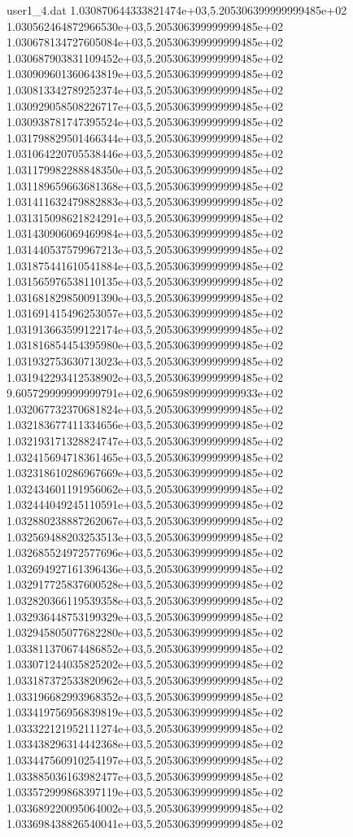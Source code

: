 \begin{filecontents}{user1_4.dat}
1.030870644333821474e+03,5.205306399999999485e+02
1.030562464872966530e+03,5.205306399999999485e+02
1.030678134727605084e+03,5.205306399999999485e+02
1.030687903831109452e+03,5.205306399999999485e+02
1.030909601360643819e+03,5.205306399999999485e+02
1.030813342789252374e+03,5.205306399999999485e+02
1.030929058508226717e+03,5.205306399999999485e+02
1.030938781747395524e+03,5.205306399999999485e+02
1.031798829501466344e+03,5.205306399999999485e+02
1.031064220705538446e+03,5.205306399999999485e+02
1.031179982288848350e+03,5.205306399999999485e+02
1.031189659663681368e+03,5.205306399999999485e+02
1.031411632479882883e+03,5.205306399999999485e+02
1.031315098621824291e+03,5.205306399999999485e+02
1.031430906069469984e+03,5.205306399999999485e+02
1.031440537579967213e+03,5.205306399999999485e+02
1.031875441610541884e+03,5.205306399999999485e+02
1.031565976538110135e+03,5.205306399999999485e+02
1.031681829850091390e+03,5.205306399999999485e+02
1.031691415496253057e+03,5.205306399999999485e+02
1.031913663599122174e+03,5.205306399999999485e+02
1.031816854454395980e+03,5.205306399999999485e+02
1.031932753630713023e+03,5.205306399999999485e+02
1.031942293412538902e+03,5.205306399999999485e+02
9.605729999999999791e+02,6.906598999999999933e+02
1.032067732370681824e+03,5.205306399999999485e+02
1.032183677411334656e+03,5.205306399999999485e+02
1.032193171328824747e+03,5.205306399999999485e+02
1.032415694718361465e+03,5.205306399999999485e+02
1.032318610286967669e+03,5.205306399999999485e+02
1.032434601191956062e+03,5.205306399999999485e+02
1.032444049245110591e+03,5.205306399999999485e+02
1.032880238887262067e+03,5.205306399999999485e+02
1.032569488203253513e+03,5.205306399999999485e+02
1.032685524972577696e+03,5.205306399999999485e+02
1.032694927161396436e+03,5.205306399999999485e+02
1.032917725837600528e+03,5.205306399999999485e+02
1.032820366119539358e+03,5.205306399999999485e+02
1.032936448753199329e+03,5.205306399999999485e+02
1.032945805077682280e+03,5.205306399999999485e+02
1.033811370674486852e+03,5.205306399999999485e+02
1.033071244035825202e+03,5.205306399999999485e+02
1.033187372533820962e+03,5.205306399999999485e+02
1.033196682993968352e+03,5.205306399999999485e+02
1.033419756956839819e+03,5.205306399999999485e+02
1.033322121952111274e+03,5.205306399999999485e+02
1.033438296314442368e+03,5.205306399999999485e+02
1.033447560910254197e+03,5.205306399999999485e+02
1.033885036163982477e+03,5.205306399999999485e+02
1.033572999868397119e+03,5.205306399999999485e+02
1.033689220095064002e+03,5.205306399999999485e+02
1.033698438826540041e+03,5.205306399999999485e+02

\end{filecontents}
